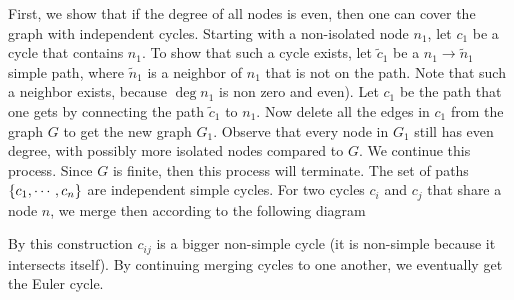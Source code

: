 \begin{solution}
	First, we show that if the degree of all nodes is even, then one can cover the graph with independent cycles. Starting with a non-isolated node $ n_1 $, let $ c_1 $ be a cycle that contains $ n_1 $. To show that such a cycle exists, let $ \tilde{c}_1 $ be a $ n_1\to\tilde{n}_1 $ simple path, where $ \tilde{n}_1 $ is a neighbor of $ n_1 $ that is not on the path. Note that such a neighbor exists, because $ \deg{n_1} $ is non zero and even). Let $ c_1 $ be the path that one gets by connecting the path $ \tilde{c}_1 $ to $ n_1 $. Now delete all the edges in $ c_1 $ from the graph $ G $ to get the new graph $ G_1 $. Observe that every node in $ G_1 $ still has even degree, with possibly more isolated nodes compared to $ G $. We continue this process. Since $ G $ is finite, then this process will terminate. The set of paths $ \{c_1,\cdots,c_n\} $ are independent simple cycles.
	For two cycles $ c_i $ and $ c_j $ that share a node $ n $, we merge then according to the following diagram
	 
	By this construction $ c_{ij} $ is a bigger non-simple cycle (it is non-simple because it intersects itself). By continuing merging cycles to one another, we eventually get the Euler cycle.

\end{solution}